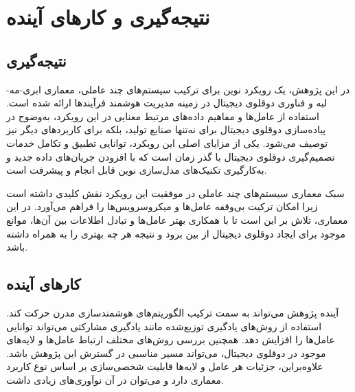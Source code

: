 \chapter{نتیجه‌گیری و کار‌های آینده}

\section{نتیجه‌گیری}
در این پژوهش، یک رویکرد نوین برای ترکیب سیستم‌های چند عاملی، معماری ابری-مه-لبه و فناوری دوقلوی دیجیتال در زمینه مدیریت هوشمند فرآیندها ارائه شده است.
استفاده از عامل‌ها و مفاهیم داده‌های مرتبط معنایی در این رویکرد، به‌وضوح در پیاده‌سازی دوقلوی دیجیتال برای نه‌تنها صنایع تولید، بلکه برای کاربرد‌های دیگر نیز توصیف می‌شود. یکی از مزایای اصلی این رویکرد، توانایی تطبیق و تکامل خدمات تصمیم‌گیری دوقلوی دیجیتال با گذر زمان است که با افزودن جریان‌های داده جدید و به‌کارگیری تکنیک‌های مدل‌سازی نوین قابل انجام و پیشرفت است.

سبک معماری سیستم‌های چند عاملی در موفقیت این رویکرد نقش کلیدی داشته است زیرا امکان ترکیت بی‌وقفه عامل‌ها و میکروسرویس‌ها را فراهم می‌آورد. در این معماری، تلاش بر این است تا با همکاری بهتر عامل‌ها و تبادل اطلاعات بین آن‌ها، موانع موجود برای ایجاد دوقلوی دیجیتال از بین برود و نتیجه هر چه بهتری را به همراه داشته باشد.

\section{کار‌های آینده}
آینده پژوهش می‌تواند به سمت ترکیب الگوریتم‌های هوشمند‌سازی مدرن حرکت کند. استفاده از روش‌های یادگیری توزیع‌شده مانند یادگیری مشارکتی
می‌تواند توانایی عامل‌ها را افزایش دهد. همچنین بررسی روش‌های مختلف ارتباط عامل‌ها و لایه‌های موجود در دوقلوی دیجیتال، می‌تواند مسیر مناسبی در گسترش این پژوهش باشد. علاوه‌براین، جزئیات هر عامل و لایه‌ها قابلیت شخصی‌سازی بر اساس نوع کاربرد معماری دارد و می‌توان در آن نو‌آوری‌های زیادی داشت.